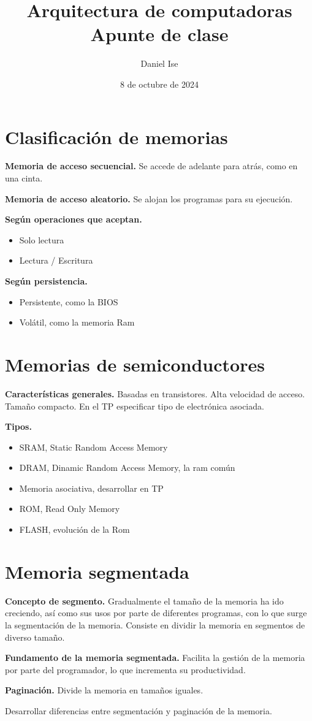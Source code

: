 \documentclass[12pt]{article}
\title{Arquitectura de computadoras\\Apunte de clase}
\author{Daniel Ise}
\date{8 de octubre de 2024}
\begin{document}
\maketitle

\tableofcontents

\section{Clasificación de memorias}

\textbf{Memoria de acceso secuencial.}
Se accede de adelante para atrás,
como en una cinta.

\textbf{Memoria de acceso aleatorio.}
Se alojan los programas para su ejecución.

\textbf{Según operaciones que aceptan.}
\begin{itemize}
    \item Solo lectura
    \item Lectura / Escritura
\end{itemize}

\textbf{Según persistencia.}
\begin{itemize}
    \item Persistente, como la BIOS
    \item Volátil, como la memoria Ram
\end{itemize}

\section{Memorias de semiconductores}

\textbf{Características generales.}
Basadas en transistores. 
Alta velocidad de acceso.
Tamaño compacto.
En el TP especificar tipo de electrónica asociada.

\textbf{Tipos.}
\begin{itemize}
    \item SRAM, Static Random Access Memory
    \item DRAM, Dinamic Random Access Memory, la ram común
    \item Memoria asociativa, desarrollar en TP
    \item ROM, Read Only Memory
    \item FLASH, evolución de la Rom
\end{itemize}

\section{Memoria segmentada}

\textbf{Concepto de segmento.}
Gradualmente el tamaño de la memoria ha ido creciendo,
así como sus usos por parte de diferentes programas,
con lo que surge la segmentación de la memoria.
Consiste en dividir la memoria en segmentos de diverso tamaño.

\textbf{Fundamento de la memoria segmentada.}
Facilita la gestión de la memoria por parte del programador,
lo que incrementa su productividad.

\textbf{Paginación.}
Divide la memoria en tamaños iguales.

Desarrollar diferencias entre segmentación y paginación de la memoria.
\end{document}
